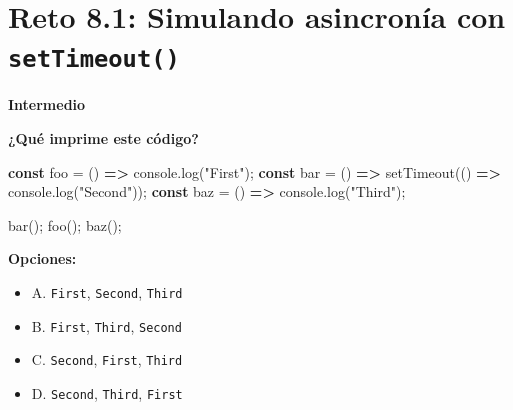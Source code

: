 \documentclass[
  letterpaper,
  DIV=11,
  numbers=noendperiod]{scrreprt}
\newenvironment{Shaded}{\begin{snugshade}}{\end{snugshade}}
\newcommand{\BuiltInTok}[1]{\textcolor[rgb]{0.00,0.23,0.31}{#1}}
\newcommand{\FunctionTok}[1]{\textcolor[rgb]{0.28,0.35,0.67}{#1}}
\newcommand{\KeywordTok}[1]{\textcolor[rgb]{0.00,0.23,0.31}{\textbf{#1}}}
\newcommand{\NormalTok}[1]{\textcolor[rgb]{0.00,0.23,0.31}{#1}}
\newcommand{\OperatorTok}[1]{\textcolor[rgb]{0.37,0.37,0.37}{#1}}
\newcommand{\PreprocessorTok}[1]{\textcolor[rgb]{0.68,0.00,0.00}{#1}}
\newcommand{\StringTok}[1]{\textcolor[rgb]{0.13,0.47,0.30}{#1}}
\providecommand{\tightlist}{%
  \setlength{\itemsep}{0pt}\setlength{\parskip}{0pt}}
\begin{document}
\section{\texorpdfstring{Reto 8.1: Simulando asincronía con
\texttt{setTimeout()}}{Reto 8.1: Simulando asincronía con setTimeout()}}\label{sec-cap8-reto1}

\begin{tcolorbox}[enhanced jigsaw, left=2mm, toprule=.15mm, leftrule=.75mm, breakable, colback=white, coltitle=black, bottomtitle=1mm, arc=.35mm, rightrule=.15mm, colframe=quarto-callout-caution-color-frame, opacitybacktitle=0.6, toptitle=1mm, opacityback=0, titlerule=0mm, title=\textcolor{quarto-callout-caution-color}{\faFire}\hspace{0.5em}{Dificultad}, bottomrule=.15mm, colbacktitle=quarto-callout-caution-color!10!white]

\textbf{Intermedio}

\end{tcolorbox}

\textbf{¿Qué imprime este código?}

\begin{Shaded}
\begin{Highlighting}[]
\KeywordTok{const}\NormalTok{ foo }\OperatorTok{=}\NormalTok{ () }\KeywordTok{=\textgreater{}} \BuiltInTok{console}\OperatorTok{.}\FunctionTok{log}\NormalTok{(}\StringTok{"First"}\NormalTok{)}\OperatorTok{;}
\KeywordTok{const}\NormalTok{ bar }\OperatorTok{=}\NormalTok{ () }\KeywordTok{=\textgreater{}} \PreprocessorTok{setTimeout}\NormalTok{(() }\KeywordTok{=\textgreater{}} \BuiltInTok{console}\OperatorTok{.}\FunctionTok{log}\NormalTok{(}\StringTok{"Second"}\NormalTok{))}\OperatorTok{;}
\KeywordTok{const}\NormalTok{ baz }\OperatorTok{=}\NormalTok{ () }\KeywordTok{=\textgreater{}} \BuiltInTok{console}\OperatorTok{.}\FunctionTok{log}\NormalTok{(}\StringTok{"Third"}\NormalTok{)}\OperatorTok{;}

\FunctionTok{bar}\NormalTok{()}\OperatorTok{;}
\FunctionTok{foo}\NormalTok{()}\OperatorTok{;}
\FunctionTok{baz}\NormalTok{()}\OperatorTok{;}
\end{Highlighting}
\end{Shaded}

\textbf{Opciones:}

\begin{itemize}
\tightlist
\item
  A. \texttt{First}, \texttt{Second}, \texttt{Third}
\item
  B. \texttt{First}, \texttt{Third}, \texttt{Second}
\item
  C. \texttt{Second}, \texttt{First}, \texttt{Third}
\item
  D. \texttt{Second}, \texttt{Third}, \texttt{First}
\end{itemize}
\end{document}

